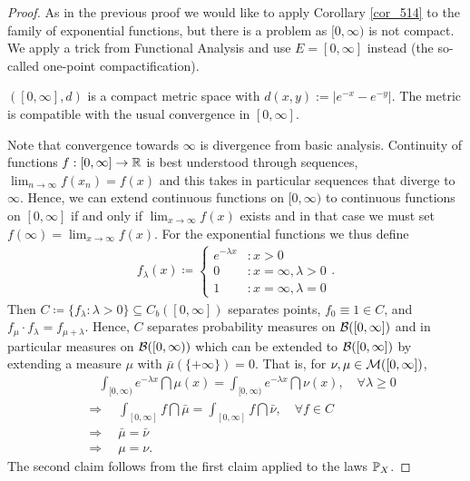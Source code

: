 \begin{proof}[Proof]
As in the previous proof we would like to apply Corollary \ref{cor_514} to the family of exponential functions, but there is a problem as $[0,\infty)$ is not compact. We apply a trick from Functional Analysis and use $E = [0, \infty]$ instead (the so-called one-point compactification).
\begin{luebung}
	$([0,\infty],d)$ is a compact metric space with $d(x,y):=|e^{-x}-e^{-y}|$. The metric is compatible with the usual convergence in $[0,\infty]$.
\end{luebung}
Note that convergence towards $\infty$ is divergence from basic analysis. Continuity of functions $f:[0,\infty]\to \R$ is best understood through sequences, $\lim_{n\to\infty} f(x_n)=f(x)$ and this takes in particular sequences that diverge to $\infty$. Hence, we can extend continuous functions on $[0,\infty)$ to continuous functions on $[0,\infty]$ if and only if $\lim_{x\to\infty} f(x)$ exists and in that case we must set $f(\infty)=\lim_{x\to\infty} f(x)$. For the exponential functions we thus define
\begin{align*}
	f_{\lambda}(x) \coloneqq \begin{cases}
			e^{- \lambda x} &: x>0 \\
			0 &: x = \infty, \lambda>0\\
			1 &: x = \infty, \lambda=0
			 \end{cases}.
\end{align*}
Then $C\coloneqq \{ f_{\lambda} \colon \lambda > 0 \}\subseteq C_b([0,\infty])$ separates points, $f_0 \equiv 1\in C$, and $f_{\mu}\cdot f_{\lambda} = f_{\mu + \lambda}$. Hence, $C$ separates probability measures on $\cB([0,\infty])$ and in particular measures on $\cB([0,\infty))$ which can be extended to $\cB([0,\infty])$ by extending a measure $\mu$ with $\bar{\mu}(\{ +\infty \} ) = 0$. That is, for $\nu, \mu\in \cM([0,\infty])$,
\begin{align*}
	&\quad \int_{[0,\infty)} e^{-\lambda x}\dint \mu(x)
	=\int_{[0,\infty)} e^{-\lambda x}\dint \nu(x),\quad \forall \lambda \geq 0\\
	& \Rightarrow \quad \int_{[0,\infty]}f \dint \bar \mu=\int_{[0,\infty]}f \dint \bar \nu,\quad \forall f\in C\\
	& \Rightarrow\quad \bar \mu=\bar \nu\\
	& \Rightarrow\quad \mu=\nu.
\end{align*}	
The second claim follows from the first claim applied to the laws $\P_X$.
\end{proof}
